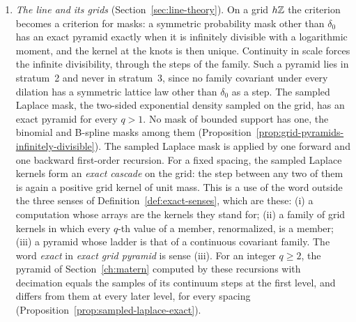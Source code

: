 \begin{enumerate}
\item \emph{The line and its grids} (Section~\ref{sec:line-theory}). On a grid $h\mathbb{Z}$ the criterion
becomes a criterion for masks: a symmetric probability mask other than $\delta_0$ has an exact
pyramid exactly when it is infinitely divisible
with a logarithmic moment, and the kernel at the knots is then unique. Continuity in scale forces
the infinite divisibility, through the steps of the family. Such a pyramid lies in
stratum~2 and never in stratum~3, since no family covariant under every dilation has a symmetric
lattice law other than $\delta_0$ as a step. The sampled Laplace mask, the two-sided exponential
density sampled on the grid, has an exact pyramid for every $q > 1$. No mask of bounded support has
one, the binomial and B-spline masks among them
(Proposition~\ref{prop:grid-pyramids-infinitely-divisible}). The sampled Laplace mask is applied by
one forward and one backward first-order recursion. For a fixed spacing, the sampled Laplace
kernels form an \emph{exact cascade} on the grid: the step between any two of them is again a
positive grid kernel of unit mass. This is a use of the word outside the three senses of
Definition~\ref{def:exact-senses}, which are these:
(i) a computation whose arrays are the kernels they stand for;
(ii) a family of grid kernels in which every $q$-th value of a member, renormalized, is a member;
(iii) a pyramid whose ladder is that of a continuous covariant family.
The word \emph{exact} in \emph{exact grid pyramid} is sense (iii). For an integer $q \ge 2$, the \Matern{} pyramid of
Section~\ref{ch:matern} computed by these recursions with decimation equals the samples of its
continuum steps at the first level, and differs from them at every later level, for every spacing
(Proposition~\ref{prop:sampled-laplace-exact}).


\end{enumerate}
